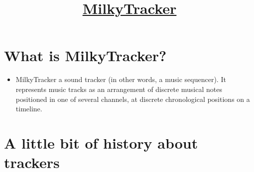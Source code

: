
\title{\href{http://www.milkytracker.org/}{MilkyTracker}}

\maketitle
\tableofcontents

\section{What is MilkyTracker?}

\begin{itemize}
\item MilkyTracker a sound tracker (in other words, a music
  sequencer). It represents music tracks as an arrangement of discrete
  musical notes positioned in one of several channels, at discrete
  chronological positions on a timeline.
\end{itemize}

\begin{center}
\end{center}

\section{A little bit of history about trackers}

